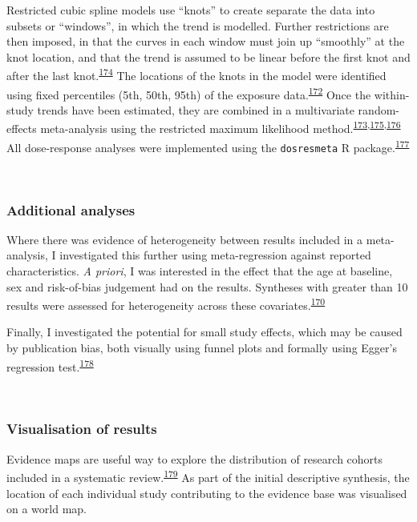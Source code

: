 \documentclass[a4paper, twoside]{templates/ociamthesis}
\begin{document}
Restricted cubic spline models use ``knots'' to create separate the data into subsets or ``windows'', in which the trend is modelled. Further restrictions are then imposed, in that the curves in each window must join up ``smoothly'' at the knot location, and that the trend is assumed to be linear before the first knot and after the last knot.\textsuperscript{\protect\hyperlink{ref-gauthier2020}{174}} The locations of the knots in the model were identified using fixed percentiles (5th, 50th, 95th) of the exposure data.\textsuperscript{\protect\hyperlink{ref-durrleman1989}{172}} Once the within-study trends have been estimated, they are combined in a multivariate random-effects meta-analysis using the restricted maximum likelihood method.\textsuperscript{\protect\hyperlink{ref-liu2009}{173},\protect\hyperlink{ref-white2009}{175},\protect\hyperlink{ref-gasparrini2012}{176}} All dose-response analyses were implemented using the \texttt{dosresmeta} R package.\textsuperscript{\protect\hyperlink{ref-crippa2016}{177}}

~

\hypertarget{additional-analyses}{%
\subsubsection{Additional analyses}\label{additional-analyses}}

Where there was evidence of heterogeneity between results included in a meta-analysis, I investigated this further using meta-regression against reported characteristics. \emph{A priori}, I was interested in the effect that the age at baseline, sex and risk-of-bias judgement had on the results. Syntheses with greater than 10 results were assessed for heterogeneity across these covariates.\textsuperscript{\protect\hyperlink{ref-deeks2019}{170}}

Finally, I investigated the potential for small study effects, which may be caused by publication bias, both visually using funnel plots and formally using Egger's regression test.\textsuperscript{\protect\hyperlink{ref-sterne2011}{178}}

~

\hypertarget{sys-rev-visualising-results}{%
\subsubsection{Visualisation of results}\label{sys-rev-visualising-results}}

Evidence maps are useful way to explore the distribution of research cohorts included in a systematic review.\textsuperscript{\protect\hyperlink{ref-saran2018}{179}} As part of the initial descriptive synthesis, the location of each individual study contributing to the evidence base was visualised on a world map.
\end{document}
